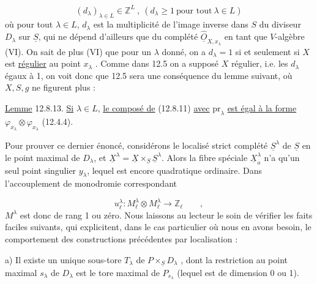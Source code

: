 
\begin{equation}\tag{12.8.12}
(d_\lambda)_{\lambda \in L} \in \mathbb{Z}^L \ , \ (d_\lambda \geqslant 1 \ \mbox{pour tout} \ \lambda \in L)
\end{equation}
où pour tout $\lambda \in L$, $d_\lambda$ est la multiplicité de l'image inverse dans $S$ du diviseur $D_\lambda$ sur $\underline{S}$, qui ne dépend d'ailleurs que du complété $\widehat{\underline{O}}_{X,x_\lambda}$ en tant que $V$-algèbre (VI\hspace{2.5em}). On sait de plus (VI\hspace{2.5em}) que pour un $\lambda$ donné, on a $d_\lambda = 1$ si et seulement si $X$ est \underline{régulier} au point $x_\lambda$ . Comme dans 12.5 on a supposé $X$ régulier, i.e. les $d_\lambda$ égaux à 1, on voit donc que 12.5 sera une conséquence du lemme suivant, où $X,S,g$ ne figurent plus :

\underline{Lemme} 12.8.13. \underline{Si} $\lambda \in L$, \underline{le composé de} (12.8.11) \underline{avec} $\mathrm{pr}_\lambda$ \underline{est égal à la forme} $\varphi_{x_\lambda} \otimes \varphi_{x_\lambda}$ (12.4.4).

Pour prouver ce dernier énoncé, considérons le localisé strict complété $\underline{S}^\lambda$ de $\underline{S}$ en le point maximal de $D_\lambda$, et $\underline{X}^\lambda = \underline{X} \times_{\underline{S}} \underline{S}^\lambda$. Alors la fibre spéciale $\underline{X}_o^\lambda$ n'a qu'un seul point singulier $y_\lambda$, lequel est encore quadratique ordinaire. Dans l'accouplement de monodromie correspondant

\begin{equation}\tag{12.8.14}
u_\ell^\lambda : M_\ell^\lambda \otimes M_\ell^\lambda \longrightarrow \mathbb{Z}_\ell \qquad ,
\end{equation}
$M^\lambda$ est donc de rang 1 ou zéro. Nous laissons au lecteur le soin de vérifier les faits faciles suivants, qui explicitent, dans le cas particulier où nous en avons besoin, le comportement des constructions précédentes par localisation :

a) Il existe un unique sous-tore $T_\lambda$ de $P \times_{\underline{S}} D_\lambda$ , dont la restriction au point maximal $s_\lambda$ de $D_\lambda$ est le tore maximal de $P_{s_\lambda}$ (lequel est de dimension 0 ou 1).




